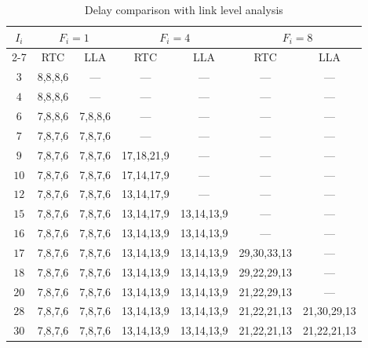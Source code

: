 \documentclass[preprint]{elsarticle}
\begin{document}
\begin{table}[htbp]
\centering
\caption{\label{LLAvsRTC}Delay comparison with link level analysis}
\begin{tabular}{|c|c|c|c|c|c|c|}
\hline
\multirow{3}{*}{$I_i$}  & \multicolumn{2}{|c|}{$F_i=1$} & \multicolumn{2}{|c|}{$F_i=4$}    &   \multicolumn{2}{|c|}{$F_i=8$} \\
\cline{2-7}
& RTC & LLA & RTC & LLA &   RTC &   LLA\\
\hline
$3$ &   8,8,8,6 &   ---   &      --- &   ---  &   ---   &      --- \\
\hline
$4$ &   8,8,8,6 &   ---   &      --- &   ---  &   ---   &      --- \\
\hline
$6$ &   7,8,8,6 &   7,8,8,6 &      --- &   ---  &   ---   &      --- \\
\hline
$7$ &   7,8,7,6 &   7,8,7,6 &      --- &   ---  &   ---   &      --- \\
\hline
$9$ &   7,8,7,6 &   7,8,7,6 &   17,18,21,9 &   ---  &   ---   &      --- \\
\hline
$10$    &   7,8,7,6 &   7,8,7,6 &   17,14,17,9  &   --- &   ---   &      --- \\
\hline
$12$    &   7,8,7,6 &   7,8,7,6 &   13,14,17,9  &   --- &   ---   &      --- \\
\hline
$15$    &   7,8,7,6 &   7,8,7,6 &   13,14,17,9  &   13,14,13,9 &   ---   &      --- \\
\hline
$16$    &   7,8,7,6 &   7,8,7,6 &   13,14,13,9  &   13,14,13,9 &   ---   &      --- \\
\hline
$17$    &   7,8,7,6 &   7,8,7,6 &   13,14,13,9  &   13,14,13,9 &   29,30,33,13   &      --- \\
\hline
$18$    &   7,8,7,6 &   7,8,7,6 &   13,14,13,9  &   13,14,13,9 &   29,22,29,13   &      --- \\
\hline
$20$    &   7,8,7,6 &   7,8,7,6 &   13,14,13,9  &   13,14,13,9 &   21,22,29,13   &      --- \\
\hline
$28$    &   7,8,7,6 &   7,8,7,6 &   13,14,13,9  &   13,14,13,9 &   21,22,21,13   &      21,30,29,13 \\
\hline
$30$    &   7,8,7,6 &   7,8,7,6 &   13,14,13,9  &   13,14,13,9 &   21,22,21,13   &      21,22,21,13 \\
\hline
\end{tabular}
\end{table}
\end{document}
